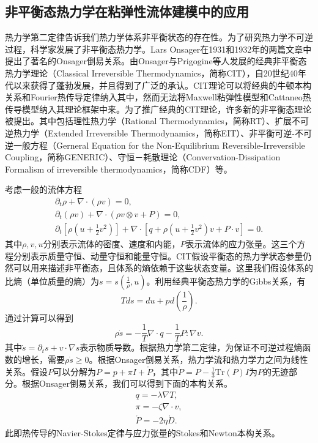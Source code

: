 \subsection{非平衡态热力学在粘弹性流体建模中的应用}
热力学第二定律告诉我们热力学体系非平衡状态的存在性。为了研究热力学不可逆过程，科学家发展了非平衡态热力学。Lars Onsager在1931和1932年的两篇文章中提出了著名的Onsager倒易关系\cite{onsager1931reciprocal,onsager1931reciprocalII}。由Onsager与Prigogine等人发展的经典非平衡态热力学理论（Classical Irreversible Thermodynamics，简称CIT），自20世纪40年代以来获得了蓬勃发展，并且得到了广泛的承认\cite{jou1996extended,truesdell2012rational}。CIT理论可以将经典的牛顿本构关系和Fourier热传导定律纳入其中，然而无法将Maxwell粘弹性模型和Cattaneo热传导模型纳入其理论框架中来。为了推广经典的CIT理论，许多新的非平衡态理论被提出。其中包括理性热力学（Rational Thermodynamics，简称RT）、扩展不可逆热力学（Extended Irreversible Thermodynamics，简称EIT）、非平衡可逆-不可逆一般方程（Gerneral Equation for the Non-Equilibrium Reversible-Irreversible Coupling，简称GENERIC）、守恒－耗散理论（Convervation-Dissipation Formalism of irreversible thermodynamics，简称CDF）等\cite{truesdell2012rational,jou1996extended,ottinger2005beyond,zhu2014conservation}。

考虑一般的流体方程
\begin{subequations} \label{eq:fluid}
	\begin{align}
		\partial_t \rho + \nabla \cdot (\rho v) = 0 ,\\
		\partial_t (\rho v) + \nabla \cdot (\rho v \otimes v + P) =  0, \\
		\partial_t[\rho (u + \frac{1}{2} v^2)] + \nabla \cdot [q + \rho (u+\frac{1}{2}v^2) v + P \cdot v] = 0.
	\end{align}
\end{subequations}
其中$\rho,v,u$分别表示流体的密度、速度和内能，$P$表示流体的应力张量。这三个方程分别表示质量守恒、动量守恒和能量守恒。CIT假设平衡态的热力学状态参量仍然可以用来描述非平衡态，且体系的熵依赖于这些状态变量。这里我们假设体系的比熵（单位质量的熵）为$s=s(\frac{1}{\rho},u)$。利用经典平衡态热力学的Gibbs关系，有
\begin{equation*}
	T ds = du + p d(\frac{1}{\rho}).
\end{equation*}
通过计算可以得到
\begin{equation*}
	\rho \dot{s} = - \frac{1}{T} \nabla \cdot q - \frac{1}{T} P: \nabla v.
\end{equation*}
其中$\dot{s} = \partial_t s + v \cdot \nabla s$表示物质导数。根据热力学第二定律，为保证不可逆过程熵函数的增长，需要$\rho \dot{s} \ge 0 $。根据Onsager倒易关系，热力学流和热力学力之间为线性关系。假设$P$可以分解为$P = p + \pi I + \mathring{P}$，其中$\mathring{P} = P - \frac{1}{3} \mbox{Tr}(P) I$为$P$的无迹部分。根据Onsager倒易关系，我们可以得到下面的本构关系。
\begin{eqnarray*}
	q = -\lambda \nabla T, \\
	\pi =  - \zeta \nabla \cdot v, \\
	\mathring{P} = - 2 \eta \mathring{D}.
\end{eqnarray*}
此即热传导的Navier-Stokes定律与应力张量的Stokes和Newton本构关系。

